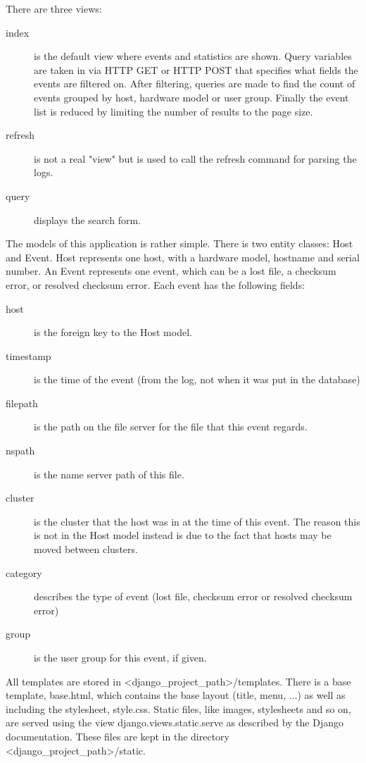 There are three views:
\begin{description}
\item[index] is the default view where events and statistics are shown. Query variables are taken in via HTTP GET or HTTP POST that specifies what fields the events are filtered on. After filtering, queries are made to find the count of events grouped by host, hardware model or user group. Finally the event list is reduced by limiting the number of results to the page size.
\item[refresh] is not a real "view" but is used to call the refresh command for parsing the logs.
\item[query] displays the search form.
\end{description} 

The models of this application is rather simple. There is two entity classes: Host and Event. Host represents one host, with a hardware model, hostname and serial number. An Event represents one event, which can be a lost file, a checksum error, or resolved checksum error. Each event has the following fields:
\begin{description}
\item[host] is the foreign key to the Host model.
\item[timestamp] is the time of the event (from the log, not when it was put in the database)
\item[filepath] is the path on the file server for the file that this event regards.
\item[nspath] is the name server path of this file.
\item[cluster] is the cluster that the host was in at the time of this event. The reason this is not in the Host model instead is due to the fact that hosts may be moved between clusters.
\item[category] describes the type of event (lost file, checksum error or resolved checksum error)
\item[group] is the user group for this event, if given.
\end{description}

All templates are stored in <django\_project\_path>/templates. There is a base template, base.html, which contains the base layout (title, menu, ...) as well as including the stylesheet, style.css. Static files, like images, stylesheets and so on, are served using the view django.views.static.serve as described by the Django documentation\cite{django}. These files are kept in the directory <django\_project\_path>/static.

